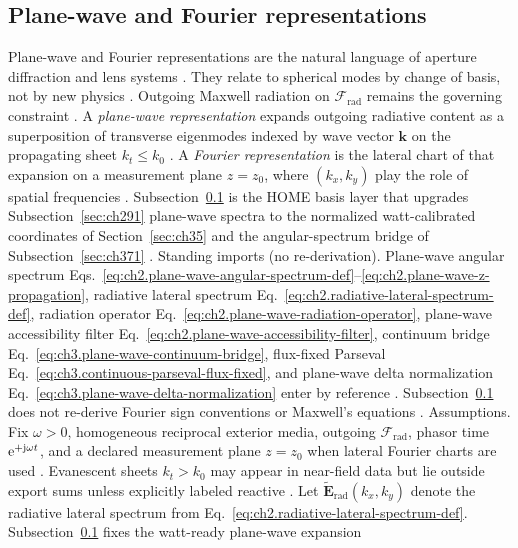 \subsection{Plane-wave and Fourier representations}
\label{sec:ch381}
Plane-wave and Fourier representations are the natural language of aperture diffraction and lens systems \cite{stratton1941}. They relate to spherical modes by change of basis, not by new physics \cite{harrington2001}. Outgoing Maxwell radiation on $\mathcal{F}_{\mathrm{rad}}$ remains the governing constraint \cite{stratton1941}.
A \emph{plane-wave representation} expands outgoing radiative content as a superposition of transverse
eigenmodes indexed by wave vector \(\mathbf{k}\) on the propagating sheet \(k_{t}\le k_{0}\)
\cite{stratton1941}. A \emph{Fourier representation} is the lateral chart of that
expansion on a measurement plane \(z=z_{0}\), where \((k_{x},k_{y})\) play the role of spatial frequencies
\cite{stratton1941}. Subsection~\ref{sec:ch381} is the HOME basis layer that upgrades
Subsection~\ref{sec:ch291} plane-wave spectra to the normalized watt-calibrated coordinates of
Section~\ref{sec:ch35} and the angular-spectrum bridge of Subsection~\ref{sec:ch371}
\cite{hansen1988}.
Standing imports (no re-derivation). Plane-wave angular spectrum Eqs.~\eqref{eq:ch2.plane-wave-angular-spectrum-def}--\eqref{eq:ch2.plane-wave-z-propagation},
radiative lateral spectrum Eq.~\eqref{eq:ch2.radiative-lateral-spectrum-def}, radiation operator
Eq.~\eqref{eq:ch2.plane-wave-radiation-operator}, plane-wave accessibility filter
Eq.~\eqref{eq:ch2.plane-wave-accessibility-filter}, continuum bridge Eq.~\eqref{eq:ch3.plane-wave-continuum-bridge},
flux-fixed Parseval Eq.~\eqref{eq:ch3.continuous-parseval-flux-fixed}, and plane-wave delta normalization
Eq.~\eqref{eq:ch3.plane-wave-delta-normalization} enter by reference \cite{stratton1941}.
Subsection~\ref{sec:ch381} does not re-derive Fourier sign conventions or Maxwell's equations
\cite{stratton1941}.
Assumptions. Fix \(\omega>0\), homogeneous reciprocal exterior media, outgoing \(\mathcal{F}_{\mathrm{rad}}\), phasor time
$\mathrm{e}^{+\mathrm{j}\omega t}$, and a declared measurement plane \(z=z_{0}\) when lateral Fourier charts are used
\cite{stratton1941}. Evanescent sheets \(k_{t}>k_{0}\) may appear in near-field data but lie outside
export sums unless explicitly labeled reactive \cite{stratton1941}.
Let \(\widetilde{\mathbf{E}}_{\mathrm{rad}}(k_{x},k_{y})\) denote the radiative lateral spectrum from
Eq.~\eqref{eq:ch2.radiative-lateral-spectrum-def}. Subsection~\ref{sec:ch381} fixes the watt-ready plane-wave expansion
